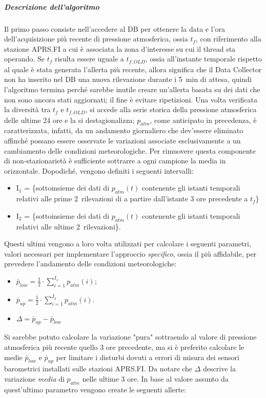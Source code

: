 \subparagraph{Descrizione dell'algoritmo} Il primo passo consiste nell'accedere al DB per ottenere la data e l'ora dell'acquisizione più recente di pressione atmosferica, ossia $t_{f}$, con riferimento alla stazione APRS.FI a cui  è associata la zona d'interesse su cui il thread sta operando. Se $t_{f}$ risulta essere uguale a $t_{f,OLD}$, ossia all'instante temporale rispetto al quale è stata generata l'allerta più recente, allora significa che il Data Collector non ha inserito nel DB una nuova rilevazione durante i \SI{5}{\minute} di attesa, quindi l'algoritmo termina perché sarebbe inutile creare un'allerta basata su dei dati che non sono ancora stati aggiornati; il fine è evitare ripetizioni. Una volta verificata la diversità tra $t_{f}$ e $t_{f,OLD}$, si accede alla serie storica della pressione atmosferica delle ultime 24 ore e la si destagionalizza; $p_{atm}$, come anticipato in precedenza, è caratterizzata, infatti, da un andamento giornaliero che dev'essere eliminato affinché possano essere osservate le variazioni associate esclusivamente a un cambiamento delle condizioni meteorologiche. Per rimuovere questa componente di non-stazionarietà è sufficiente sottrarre a ogni campione la media in orizzontale. Dopodiché, vengono definiti i seguenti intervalli:
\begin{itemize}
	\item I$_1$ = \{sottoinsieme dei dati di $p_{atm}(t)$ contenente gli istanti temporali relativi alle prime 2~rilevazioni di a partire dall'istante 3 ore precedente a $t_f$\}
	\item I$_2$ = \{sottoinsieme dei dati di $p_{atm}(t)$ contenente gli istanti temporali relativi alle ultime 2~rilevazioni\}.
\end{itemize}
Questi ultimi vengono a loro volta utilizzati per calcolare i seguenti parametri, valori necessari per implementare l'approccio \textit{specifico}, ossia il più affidabile, per prevedere l'andamento delle condizioni meteorologiche:
\begin{itemize}
	\item $\bar{p}_{low} = \frac{1}{2} \cdot \sum_{i = 1}^{I_1} p_{atm}(i)$;
	\item $\bar{p}_{up} = \frac{1}{2} \cdot \sum_{i = 1}^{I_2} p_{atm}(i)$.
	\item $\Delta = \bar{p}_{up} - \bar{p}_{low}$	
\end{itemize}
Si sarebbe potuto calcolare la variazione "pura" sottraendo al valore di pressione atmosferica più recente quello 3 ore precedente, ma si è preferito calcolare le medie $\bar{p}_{low}$ e $\bar{p}_{up}$ per limitare i disturbi dovuti a errori di misura dei sensori barometrici installati sulle stazioni APRS.FI. Da notare che $\Delta$ descrive la variazione \textit{media} di $p_{atm}$ nelle ultime 3 ore. In base al valore assunto da quest'ultimo parametro vengono create le seguenti allerte:

